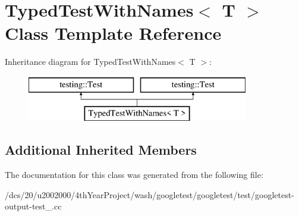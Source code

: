 \hypertarget{classTypedTestWithNames}{}\section{Typed\+Test\+With\+Names$<$ T $>$ Class Template Reference}
\label{classTypedTestWithNames}
Inheritance diagram for Typed\+Test\+With\+Names$<$ T $>$\+:\begin{figure}[H]
\begin{center}
\leavevmode
\includegraphics[height=2.000000cm]{classTypedTestWithNames}
\end{center}
\end{figure}
\subsection*{Additional Inherited Members}


The documentation for this class was generated from the following file\+:\begin{DoxyCompactItemize}
\item 
/dcs/20/u2002000/4th\+Year\+Project/wash/googletest/googletest/test/googletest-\/output-\/test\+\_\+.\+cc\end{DoxyCompactItemize}
